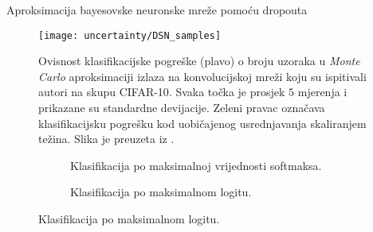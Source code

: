 \documentclass{beamer}
\begin{document}
\begin{frame}{Aproksimacija bayesovske neuronske mreže pomoću dropouta}
\begin{figure}
	\centering
	\texttt{[image: uncertainty/DSN\_samples]}
	\caption{Ovisnost klasifikacijske pogreške (plavo) o broju uzoraka u \textit{Monte Carlo} aproksimaciji izlaza na konvolucijskoj mreži koju su ispitivali autori \citep{Gal:2016:BCNNBAVI} na skupu CIFAR-10. Svaka točka je prosjek $5$ mjerenja i prikazane su standardne devijacije. Zeleni pravac označava klasifikacijsku pogrešku kod uobičajenog usrednjavanja skaliranjem težina. Slika je preuzeta iz \citet{Gal:2016:BCNNBAVI}.}
	\label{fig:mc-drouput-samples-DSN}
\end{figure}
\end{frame}

\begin{frame}[shrink]{}
\begin{minipage}[b]{1.4\textwidth}
\begin{figure}
	\centering
	\begin{subfigure}[t]{1\textwidth}
		\centering
		\caption{Klasifikacija po maksimalnoj vrijednosti softmaksa.}
		\label{subfig:graf-ood-softmax-temp}
	\end{subfigure}

	\begin{subfigure}[t]{1\textwidth}
		\centering
		\caption{Klasifikacija po maksimalnom logitu.}
		\label{subfig:graf-ood-logiti}
	\end{subfigure}


\end{figure}
\end{minipage}
\end{frame}
\end{document}
